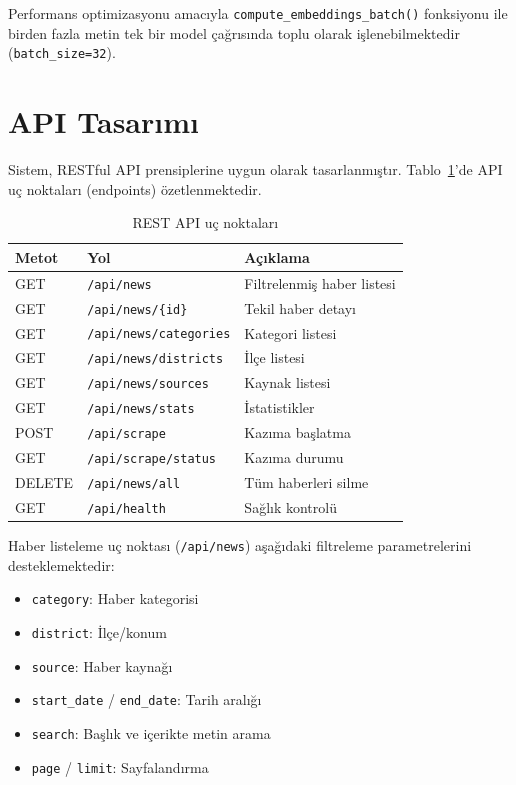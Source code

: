\documentclass[conference]{IEEEtran}
\begin{document}
Performans optimizasyonu amacıyla \texttt{compute\_embeddings\_batch()} fonksiyonu ile birden fazla metin tek bir model çağrısında toplu olarak işlenebilmektedir (\texttt{batch\_size=32}).

\section{API Tasarımı}
\label{sec:api}

Sistem, RESTful API prensiplerine uygun olarak tasarlanmıştır. Tablo~\ref{tab:api}'de API uç noktaları (endpoints) özetlenmektedir.

\begin{table}[H]
\centering
\caption{REST API uç noktaları}
\label{tab:api}
\begin{tabular}{@{}p{1cm}p{3.2cm}p{3.5cm}@{}}
\toprule
\textbf{Metot} & \textbf{Yol} & \textbf{Açıklama} \\
\midrule
GET & \texttt{/api/news} & Filtrelenmiş haber listesi \\
GET & \texttt{/api/news/\{id\}} & Tekil haber detayı \\
GET & \texttt{/api/news/categories} & Kategori listesi \\
GET & \texttt{/api/news/districts} & İlçe listesi \\
GET & \texttt{/api/news/sources} & Kaynak listesi \\
GET & \texttt{/api/news/stats} & İstatistikler \\
POST & \texttt{/api/scrape} & Kazıma başlatma \\
GET & \texttt{/api/scrape/status} & Kazıma durumu \\
DELETE & \texttt{/api/news/all} & Tüm haberleri silme \\
GET & \texttt{/api/health} & Sağlık kontrolü \\
\bottomrule
\end{tabular}
\end{table}

Haber listeleme uç noktası (\texttt{/api/news}) aşağıdaki filtreleme parametrelerini desteklemektedir:

\begin{itemize}[leftmargin=*]
    \item \texttt{category}: Haber kategorisi
    \item \texttt{district}: İlçe/konum
    \item \texttt{source}: Haber kaynağı
    \item \texttt{start\_date} / \texttt{end\_date}: Tarih aralığı
    \item \texttt{search}: Başlık ve içerikte metin arama
    \item \texttt{page} / \texttt{limit}: Sayfalandırma
\end{itemize}
\end{document}
